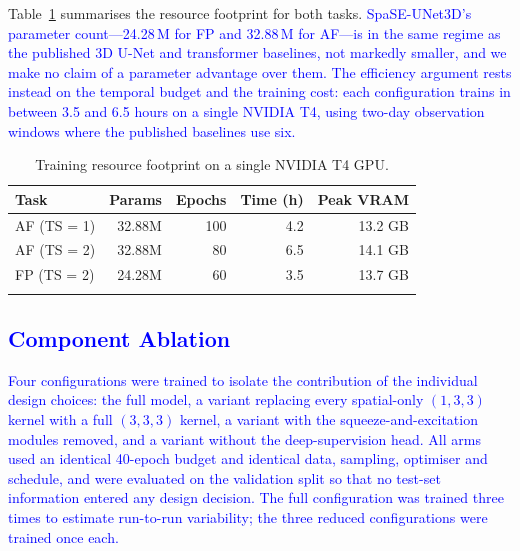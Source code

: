 \documentclass[sensors,article,submit,moreauthors,pdftex]{Definitions/mdpi}
\newcommand{\rev}[1]{\textcolor{blue}{#1}}
\begin{document}
Table~\ref{tab:fp_resource} summarises the resource footprint for both tasks. \rev{SpaSE-UNet3D's parameter count---24.28\,M for FP and 32.88\,M for AF---is in the same regime as the published 3D U-Net and transformer baselines, not markedly smaller, and we make no claim of a parameter advantage over them. The efficiency argument rests instead on the temporal budget and the training cost: each configuration trains in between 3.5 and 6.5 hours on a single NVIDIA T4, using two-day observation windows where the published baselines use six.}

\begin{table}[H]
\centering
\caption{Training resource footprint on a single NVIDIA T4 GPU.}
\label{tab:fp_resource}
\renewcommand{\arraystretch}{1.2}
\begin{tabular}{@{}lrrrr@{}}
\arrayrulecolor{hdrblue}
\toprule
\rowcolor{hdrblue}
\color{white}\textbf{Task} &
\color{white}\textbf{Params} &
\color{white}\textbf{Epochs} &
\color{white}\textbf{Time (h)} &
\color{white}\textbf{Peak VRAM} \\
\midrule
\rowcolor{rowA} AF (TS = 1) & 32.88M & 100 & 4.2 & 13.2 GB \\
\rowcolor{white} AF (TS = 2) & 32.88M & 80  & 6.5 & 14.1 GB \\
\rowcolor{rowA} FP (TS = 2) & 24.28M & 60  & 3.5 & 13.7 GB \\
\arrayrulecolor{hdrblue}\bottomrule
\end{tabular}
\end{table}


\subsection{\rev{Component Ablation}}
\label{sec:ablation}

\rev{Four configurations were trained to isolate the contribution of the
individual design choices: the full model, a variant replacing every
spatial-only $(1,3,3)$ kernel with a full $(3,3,3)$ kernel, a variant with the
squeeze-and-excitation modules removed, and a variant without the
deep-supervision head. All arms used an identical 40-epoch budget and identical
data, sampling, optimiser and schedule, and were evaluated on the validation
split so that no test-set information entered any design decision. The full
configuration was trained three times to estimate run-to-run variability; the
three reduced configurations were trained once each.}
\end{document}
